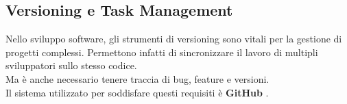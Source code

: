 \documentclass[\main/tesi.tex]{subfiles}
\begin{document}
\subsection{Versioning e Task Management}
Nello sviluppo software, gli strumenti di versioning sono vitali per la gestione di progetti complessi.
Permettono infatti di sincronizzare il lavoro di multipli sviluppatori sullo stesso codice.\\
Ma è anche necessario tenere traccia di bug, feature e versioni.\\
Il sistema utilizzato per soddisfare questi requisiti è \textbf{GitHub} \cite{github}.\\
\end{document}
